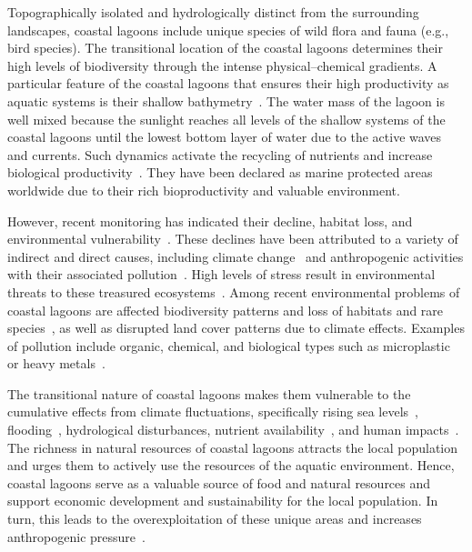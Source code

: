 \documentclass[jmse,article,accept,pdftex,oneauthor]{Definitions/mdpi}
\begin{document}
Topographically isolated and hydrologically distinct from the surrounding landscapes, coastal lagoons include unique species of wild flora and fauna (e.g., bird species). The transitional location of the coastal lagoons determines their high levels of biodiversity through the intense physical--chemical gradients. A particular feature of the coastal lagoons that ensures their high productivity as aquatic systems is their shallow bathymetry~\cite{PEREZRUZAFA2024171264}. The water mass of the lagoon is well mixed because the sunlight reaches all levels of the shallow systems of the coastal lagoons until the lowest bottom layer of water due to the active waves and currents. Such dynamics activate the recycling of nutrients and increase biological productivity~\cite{Kennish2016}. They have been declared as marine protected areas worldwide due to their rich bioproductivity and valuable environment. 

However, recent monitoring has indicated their decline, habitat loss, and environmental vulnerability~\cite{BASTOS2023102144,SUWANDHAHANNADI2024107069,MOHAPATRA2023163109}. These declines have been attributed to a variety of indirect and direct causes, including climate change~\cite{SIMANTIRIS2023108231} and anthropogenic activities with their associated pollution~\cite{GHANDOURAH2023102982}. High levels of stress result  in   environmental threats to these treasured ecosystems~\cite{Davis}. Among recent environmental problems of coastal lagoons are affected biodiversity patterns and loss of habitats and rare species~\cite{Kumari2022,HERBERT2020631}, as well as disrupted land cover patterns due to climate effects. Examples of pollution include organic, chemical, and biological types such as microplastic~\cite{GARCESORDONEZ2022120366,BRUSCHI2023110596} or heavy metals~\cite{Tripathi2022}. 

The transitional nature of coastal lagoons makes them vulnerable to the cumulative effects from  climate fluctuations, specifically rising sea levels~\cite{CARRASCO2016356}, flooding~\cite{INACIO2023100491}, hydrological disturbances, nutrient availability~\cite{LUNARDINI2000135}, and human impacts~\cite{Luglie}. The richness in natural resources of coastal lagoons attracts the local population and urges them to actively use the resources of the aquatic environment. Hence, coastal lagoons serve as a valuable source of food and natural resources and support economic development and sustainability for the local population. In turn, this leads to the overexploitation of these unique areas and increases anthropogenic pressure~\cite{PAULY1994377}. 
\end{document}
